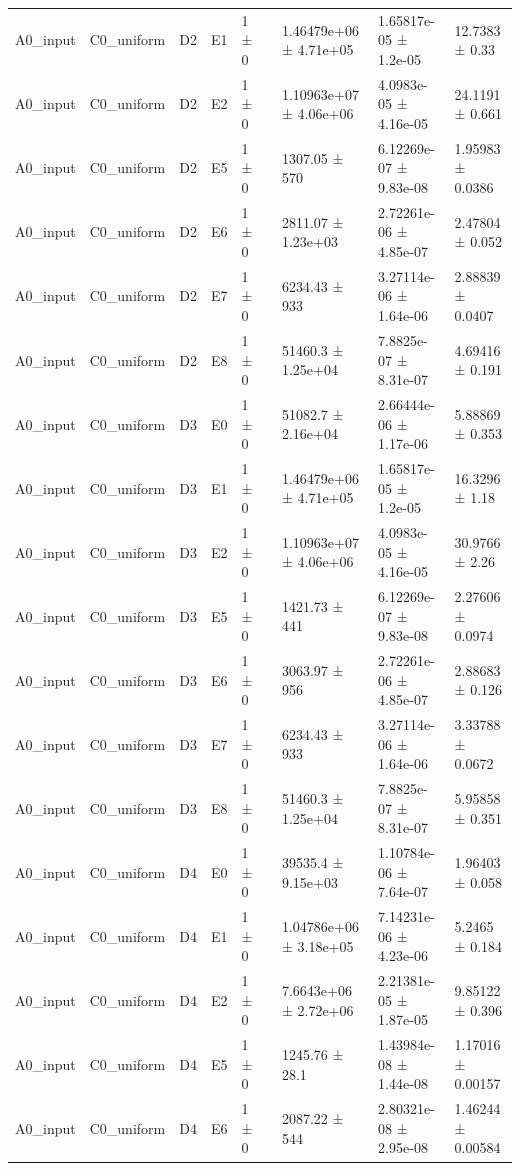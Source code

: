 \begin{table}
\begin{tabular}{lllllllll}
A0\_input & C0\_uniform & D2 & E1 & 1 ± 0 &  & 1.46479e+06 ± 4.71e+05 & 1.65817e-05 ± 1.2e-05 & 12.7383 ± 0.33 \\
A0\_input & C0\_uniform & D2 & E2 & 1 ± 0 &  & 1.10963e+07 ± 4.06e+06 & 4.0983e-05 ± 4.16e-05 & 24.1191 ± 0.661 \\
A0\_input & C0\_uniform & D2 & E5 & 1 ± 0 &  & 1307.05 ± 570 & 6.12269e-07 ± 9.83e-08 & 1.95983 ± 0.0386 \\
A0\_input & C0\_uniform & D2 & E6 & 1 ± 0 &  & 2811.07 ± 1.23e+03 & 2.72261e-06 ± 4.85e-07 & 2.47804 ± 0.052 \\
A0\_input & C0\_uniform & D2 & E7 & 1 ± 0 &  & 6234.43 ± 933 & 3.27114e-06 ± 1.64e-06 & 2.88839 ± 0.0407 \\
A0\_input & C0\_uniform & D2 & E8 & 1 ± 0 &  & 51460.3 ± 1.25e+04 & 7.8825e-07 ± 8.31e-07 & 4.69416 ± 0.191 \\
A0\_input & C0\_uniform & D3 & E0 & 1 ± 0 &  & 51082.7 ± 2.16e+04 & 2.66444e-06 ± 1.17e-06 & 5.88869 ± 0.353 \\
A0\_input & C0\_uniform & D3 & E1 & 1 ± 0 &  & 1.46479e+06 ± 4.71e+05 & 1.65817e-05 ± 1.2e-05 & 16.3296 ± 1.18 \\
A0\_input & C0\_uniform & D3 & E2 & 1 ± 0 &  & 1.10963e+07 ± 4.06e+06 & 4.0983e-05 ± 4.16e-05 & 30.9766 ± 2.26 \\
A0\_input & C0\_uniform & D3 & E5 & 1 ± 0 &  & 1421.73 ± 441 & 6.12269e-07 ± 9.83e-08 & 2.27606 ± 0.0974 \\
A0\_input & C0\_uniform & D3 & E6 & 1 ± 0 &  & 3063.97 ± 956 & 2.72261e-06 ± 4.85e-07 & 2.88683 ± 0.126 \\
A0\_input & C0\_uniform & D3 & E7 & 1 ± 0 &  & 6234.43 ± 933 & 3.27114e-06 ± 1.64e-06 & 3.33788 ± 0.0672 \\
A0\_input & C0\_uniform & D3 & E8 & 1 ± 0 &  & 51460.3 ± 1.25e+04 & 7.8825e-07 ± 8.31e-07 & 5.95858 ± 0.351 \\
A0\_input & C0\_uniform & D4 & E0 & 1 ± 0 &  & 39535.4 ± 9.15e+03 & 1.10784e-06 ± 7.64e-07 & 1.96403 ± 0.058 \\
A0\_input & C0\_uniform & D4 & E1 & 1 ± 0 &  & 1.04786e+06 ± 3.18e+05 & 7.14231e-06 ± 4.23e-06 & 5.2465 ± 0.184 \\
A0\_input & C0\_uniform & D4 & E2 & 1 ± 0 &  & 7.6643e+06 ± 2.72e+06 & 2.21381e-05 ± 1.87e-05 & 9.85122 ± 0.396 \\
A0\_input & C0\_uniform & D4 & E5 & 1 ± 0 &  & 1245.76 ± 28.1 & 1.43984e-08 ± 1.44e-08 & 1.17016 ± 0.00157 \\
A0\_input & C0\_uniform & D4 & E6 & 1 ± 0 &  & 2087.22 ± 544 & 2.80321e-08 ± 2.95e-08 & 1.46244 ± 0.00584 \\

\end{tabular}
\end{table}
